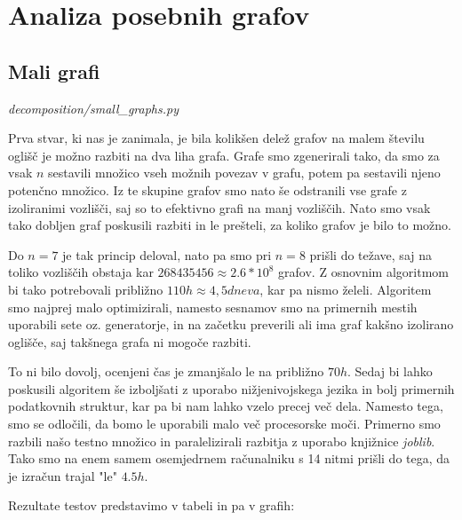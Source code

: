 \documentclass[12pt,a4paper]{amsart}
\theoremstyle{definition} %
\theoremstyle{plain} %
\begin{document}
\section{Analiza posebnih grafov}

\subsection{Mali grafi}
\emph{decomposition/small\_graphs.py}

Prva stvar, ki nas je zanimala, je bila kolikšen delež grafov na malem številu oglišč je možno razbiti na dva liha grafa.
Grafe smo zgenerirali tako, da smo za vsak $n$ sestavili množico vseh možnih povezav v grafu, potem pa sestavili njeno potenčno množico.
Iz te skupine grafov smo nato še odstranili vse grafe z izoliranimi vozlišči, saj so to efektivno grafi na manj vozliščih.
Nato smo vsak tako dobljen graf poskusili razbiti in le prešteli, za koliko grafov je bilo to možno.

Do $n=7$ je tak princip deloval, nato pa smo pri $n=8$ prišli do težave, saj na toliko vozliščih obstaja kar $268435456 \approx 2.6 * 10^8$ grafov.
Z osnovnim algoritmom bi tako potrebovali približno $110h \approx 4,5 dneva$, kar pa nismo želeli. Algoritem smo najprej malo optimizirali, namesto sesnamov smo
na primernih mestih uporabili sete oz. generatorje, in na začetku preverili ali ima graf kakšno izolirano oglišče, saj takšnega grafa ni mogoče razbiti.

To ni bilo dovolj, ocenjeni čas je zmanjšalo le na približno $70h$. Sedaj bi lahko poskusili algoritem še izboljšati z uporabo nižjenivojskega jezika in bolj
primernih podatkovnih struktur, kar pa bi nam lahko vzelo precej več dela. Namesto tega, smo se odločili, da bomo le uporabili malo več procesorske moči. Primerno
smo razbili našo testno množico in paralelizirali razbitja z uporabo knjižnice \emph{joblib}.
Tako smo na enem samem osemjedrnem računalniku s 14 nitmi prišli do tega, da je izračun trajal "le" $4.5h$.

\noindent Rezultate testov predstavimo v tabeli in pa v grafih:
\end{document}
